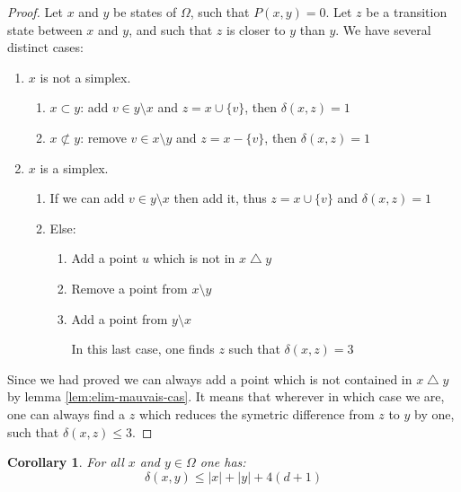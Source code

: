 \documentclass[a4paper]{article}
\newtheorem{corollary}{Corollary}[subsection]
\begin{document}
\begin{proof}
  Let $x$ and $y$ be states of $\Omega$, such that $P(x,y)=0$. Let $z$ be a transition state between $x$ and $y$, and such that $z$ is closer to $y$ than $y$. We have several distinct cases:

  \begin{enumerate}
    \item $x$ is not a simplex.
    \begin{enumerate}
      \item $x \subset y$: add $v \in y \setminus x$ and $z = x \cup \{v\}$, then $\delta(x,z) = 1$
      \item $x \not\subset y$: remove $v \in x \setminus y$ and $z = x - \{v\}$, then $\delta(x,z) = 1$
    \end{enumerate}
    \item $x$ is a simplex.
    \begin{enumerate}
      \item If we can add $v \in y \setminus x$ then add it, thus $z = x \cup \{v\}$ and $\delta(x,z) = 1$
      \item Else:
      \begin{enumerate}
        \item Add a point $u$ which is not in $x \bigtriangleup y$
        \item Remove a point from  $x \setminus y$
        \item Add  a point from $y \setminus x$

        In this last case, one finds $z$ such that $\delta(x,z) = 3$
      \end{enumerate}
    \end{enumerate}
  \end{enumerate}

  Since we had proved we can always add a point which is not contained in $x \bigtriangleup y$ by lemma \ref{lem:elim-mauvais-cas}. It means that wherever in which case we are, one can always find a $z$ which reduces the symetric difference from $z$ to $y$ by one, such that $\delta(x,z) \leq{3}$.

\end{proof}

\begin{corollary}\label{coro:diameter}
  For all $x$ and $y \in \Omega$ one has:
  \begin{equation}
    \delta(x,y) \leq |x| + |y| + 4(d+1)
  \end{equation}
\end{corollary}
\end{document}
